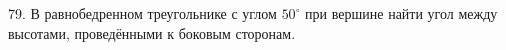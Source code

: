 79. В равнобедренном треугольнике с углом $50^\circ$ при вершине найти угол между высотами, проведёнными к боковым сторонам.\\
